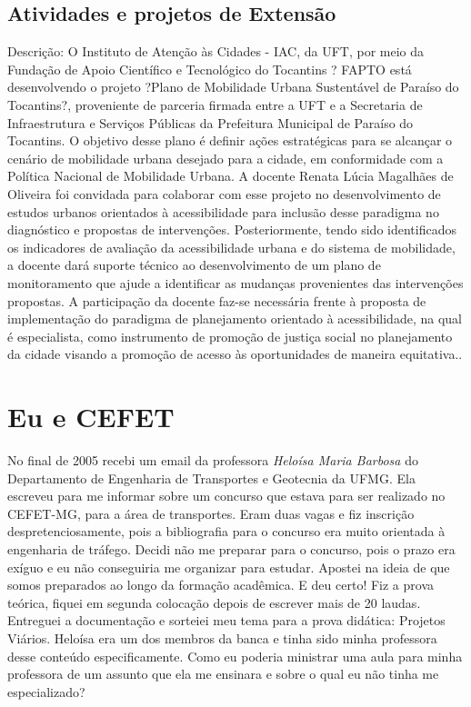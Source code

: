 \documentclass[
]{book}
\begin{document}
\hypertarget{atividades-e-projetos-de-extensuxe3o}{%
\section{Atividades e projetos de Extensão}\label{atividades-e-projetos-de-extensuxe3o}}

Descrição: O Instituto de Atenção às Cidades - IAC, da UFT, por meio da Fundação de Apoio Científico e Tecnológico do Tocantins ? FAPTO está desenvolvendo o projeto ?Plano de Mobilidade Urbana Sustentável de Paraíso do Tocantins?, proveniente de parceria firmada entre a UFT e a Secretaria de Infraestrutura e Serviços Públicas da Prefeitura Municipal de Paraíso do Tocantins. O objetivo desse plano é definir ações estratégicas para se alcançar o cenário de mobilidade urbana desejado para a cidade, em conformidade com a Política Nacional de Mobilidade Urbana. A docente Renata Lúcia Magalhães de Oliveira foi convidada para colaborar com esse projeto no desenvolvimento de estudos urbanos orientados à acessibilidade para inclusão desse paradigma no diagnóstico e propostas de intervenções. Posteriormente, tendo sido identificados os indicadores de avaliação da acessibilidade urbana e do sistema de mobilidade, a docente dará suporte técnico ao desenvolvimento de um plano de monitoramento que ajude a identificar as mudanças provenientes das intervenções propostas. A participação da docente faz-se necessária frente à proposta de implementação do paradigma de planejamento orientado à acessibilidade, na qual é especialista, como instrumento de promoção de justiça social no planejamento da cidade visando a promoção de acesso às oportunidades de maneira equitativa..

\hypertarget{eu-e-cefet}{%
\chapter{Eu e CEFET}\label{eu-e-cefet}}

No final de 2005 recebi um email da professora \emph{Heloísa Maria Barbosa}
do Departamento de Engenharia de Transportes e Geotecnia da UFMG. Ela
escreveu para me informar sobre um concurso que estava para ser
realizado no CEFET-MG, para a área de transportes. Eram duas vagas e fiz
inscrição despretenciosamente, pois a bibliografia para o concurso era
muito orientada à engenharia de tráfego. Decidi não me preparar para o
concurso, pois o prazo era exíguo e eu não conseguiria me organizar para
estudar. Apostei na ideia de que somos preparados ao longo da formação
acadêmica. E deu certo! Fiz a prova teórica, fiquei em segunda colocação
depois de escrever mais de 20 laudas. Entreguei a documentação e
sorteiei meu tema para a prova didática: Projetos Viários. Heloísa era
um dos membros da banca e tinha sido minha professora desse conteúdo
especificamente. Como eu poderia ministrar uma aula para minha
professora de um assunto que ela me ensinara e sobre o qual eu não tinha
me especializado?
\end{document}
